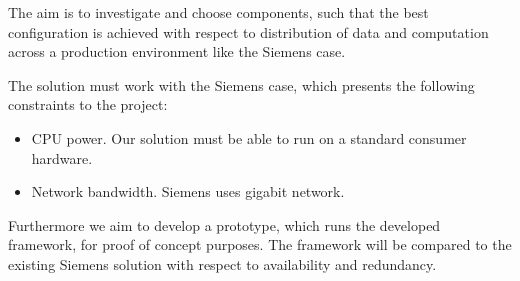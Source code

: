 The aim is to investigate and choose components, such that the best configuration is achieved with respect to distribution of data and computation across a production environment like the Siemens case. 


The solution must work with the Siemens case, which presents the following constraints to the project:
\begin{itemize}
	\item CPU power. Our solution must be able to run on a standard consumer hardware.
	\item Network bandwidth. Siemens uses gigabit network. 
\end{itemize}
Furthermore we aim to develop a prototype, which runs the developed framework, for proof of concept purposes. The framework will be compared to the existing Siemens solution with respect to availability and redundancy. 


